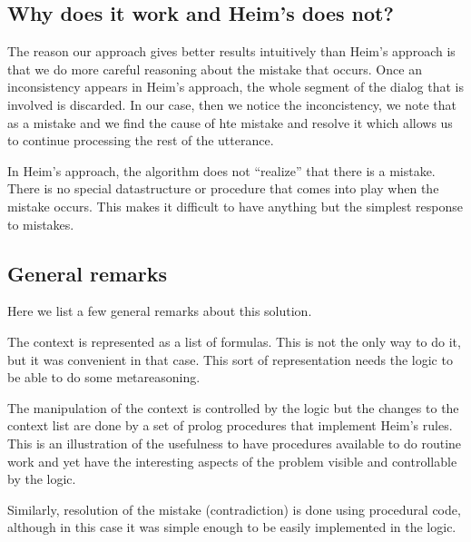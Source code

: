 \documentclass{article}
\begin{document}
\subsection{Why does it work and Heim's does not?}

The reason our approach gives better results intuitively than Heim's
approach is that we do more careful reasoning about the mistake that
occurs. Once an inconsistency appears in Heim's approach, the whole
segment of the dialog that is involved is discarded. In our case, then
we notice the inconcistency, we note that as a mistake and we find the
cause of hte mistake and resolve it which allows us to continue
processing the rest of the utterance.

In Heim's approach, the algorithm does not ``realize'' that there is a
mistake. There is no special datastructure or procedure that comes
into play when the mistake occurs. This makes it difficult to have
anything but the simplest response to mistakes. 


\subsection{General remarks}

Here we list a few general remarks about this solution.

The context is represented as a list of formulas. This is not the only
way to do it, but it was convenient in that case. This sort of
representation needs the logic to be able to do some metareasoning.

The manipulation of the context is controlled by the logic but the
changes to the context list are done by a set of prolog procedures
that implement Heim's rules. This is an illustration of the usefulness
to have procedures available to do routine work and yet have the
interesting aspects of the problem visible and controllable by the
logic. 

Similarly, resolution of the mistake (contradiction) is done using
procedural code, although in this case it was simple enough to be
easily implemented in the logic.
\end{document}
